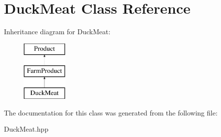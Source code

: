 \hypertarget{class_duck_meat}{}\section{Duck\+Meat Class Reference}
\label{class_duck_meat}
Inheritance diagram for Duck\+Meat\+:\begin{figure}[H]
\begin{center}
\leavevmode
\includegraphics[height=3.000000cm]{class_duck_meat}
\end{center}
\end{figure}


The documentation for this class was generated from the following file\+:\begin{DoxyCompactItemize}
\item 
Duck\+Meat.\+hpp\end{DoxyCompactItemize}
